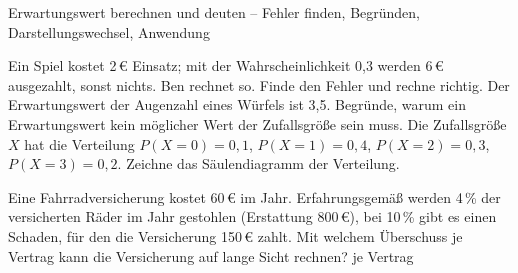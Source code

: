 \begin{aufgabe}{Erwartungswert berechnen und deuten – Fehler finden, Begründen, Darstellungswechsel, Anwendung}
\begin{teile}
\teil Ein Spiel kostet 2\,€ Einsatz; mit der Wahrscheinlichkeit 0{,}3 werden 6\,€ ausgezahlt, sonst nichts. Ben rechnet so. Finde den Fehler und rechne richtig. 
\teil Der Erwartungswert der Augenzahl eines Würfels ist 3{,}5. Begründe, warum ein Erwartungswert kein möglicher Wert der Zufallsgröße sein muss.
\teil Die Zufallsgröße $X$ hat die Verteilung $P(X = 0) = 0{,}1$, $P(X = 1) = 0{,}4$, $P(X = 2) = 0{,}3$, $P(X = 3) = 0{,}2$. Zeichne das Säulendiagramm der Verteilung.

\teil Eine Fahrradversicherung kostet 60\,€ im Jahr. Erfahrungsgemäß werden 4\,\% der versicherten Räder im Jahr gestohlen (Erstattung 800\,€), bei 10\,\% gibt es einen Schaden, für den die Versicherung 150\,€ zahlt. Mit welchem Überschuss je Vertrag kann die Versicherung auf lange Sicht rechnen? \leerfeld[€] je Vertrag
\end{teile}
\end{aufgabe}
